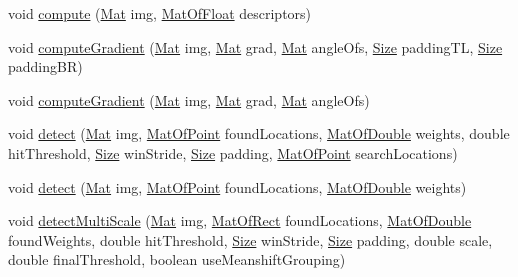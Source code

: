 \begin{DoxyCompactItemize}
\item 
void \mbox{\hyperlink{classorg_1_1opencv_1_1objdetect_1_1_h_o_g_descriptor_ae6d657ee7efb071fa3944b64dfa7db18}{compute}} (\mbox{\hyperlink{classorg_1_1opencv_1_1core_1_1_mat}{Mat}} img, \mbox{\hyperlink{classorg_1_1opencv_1_1core_1_1_mat_of_float}{Mat\+Of\+Float}} descriptors)
\item 
void \mbox{\hyperlink{classorg_1_1opencv_1_1objdetect_1_1_h_o_g_descriptor_aed983cfea26dfd1de8befbf145b4f5b2}{compute\+Gradient}} (\mbox{\hyperlink{classorg_1_1opencv_1_1core_1_1_mat}{Mat}} img, \mbox{\hyperlink{classorg_1_1opencv_1_1core_1_1_mat}{Mat}} grad, \mbox{\hyperlink{classorg_1_1opencv_1_1core_1_1_mat}{Mat}} angle\+Ofs, \mbox{\hyperlink{classorg_1_1opencv_1_1core_1_1_size}{Size}} padding\+TL, \mbox{\hyperlink{classorg_1_1opencv_1_1core_1_1_size}{Size}} padding\+BR)
\item 
void \mbox{\hyperlink{classorg_1_1opencv_1_1objdetect_1_1_h_o_g_descriptor_a3901af3c2c750a427cb8bf250f00871d}{compute\+Gradient}} (\mbox{\hyperlink{classorg_1_1opencv_1_1core_1_1_mat}{Mat}} img, \mbox{\hyperlink{classorg_1_1opencv_1_1core_1_1_mat}{Mat}} grad, \mbox{\hyperlink{classorg_1_1opencv_1_1core_1_1_mat}{Mat}} angle\+Ofs)
\item 
void \mbox{\hyperlink{classorg_1_1opencv_1_1objdetect_1_1_h_o_g_descriptor_a030da8403a85d584e1dc1957838d4336}{detect}} (\mbox{\hyperlink{classorg_1_1opencv_1_1core_1_1_mat}{Mat}} img, \mbox{\hyperlink{classorg_1_1opencv_1_1core_1_1_mat_of_point}{Mat\+Of\+Point}} found\+Locations, \mbox{\hyperlink{classorg_1_1opencv_1_1core_1_1_mat_of_double}{Mat\+Of\+Double}} weights, double hit\+Threshold, \mbox{\hyperlink{classorg_1_1opencv_1_1core_1_1_size}{Size}} win\+Stride, \mbox{\hyperlink{classorg_1_1opencv_1_1core_1_1_size}{Size}} padding, \mbox{\hyperlink{classorg_1_1opencv_1_1core_1_1_mat_of_point}{Mat\+Of\+Point}} search\+Locations)
\item 
void \mbox{\hyperlink{classorg_1_1opencv_1_1objdetect_1_1_h_o_g_descriptor_a48e794dbc6c306f564e56ad8ff4e34a9}{detect}} (\mbox{\hyperlink{classorg_1_1opencv_1_1core_1_1_mat}{Mat}} img, \mbox{\hyperlink{classorg_1_1opencv_1_1core_1_1_mat_of_point}{Mat\+Of\+Point}} found\+Locations, \mbox{\hyperlink{classorg_1_1opencv_1_1core_1_1_mat_of_double}{Mat\+Of\+Double}} weights)
\item 
void \mbox{\hyperlink{classorg_1_1opencv_1_1objdetect_1_1_h_o_g_descriptor_a3f913308de613f4411e1798c18b32be6}{detect\+Multi\+Scale}} (\mbox{\hyperlink{classorg_1_1opencv_1_1core_1_1_mat}{Mat}} img, \mbox{\hyperlink{classorg_1_1opencv_1_1core_1_1_mat_of_rect}{Mat\+Of\+Rect}} found\+Locations, \mbox{\hyperlink{classorg_1_1opencv_1_1core_1_1_mat_of_double}{Mat\+Of\+Double}} found\+Weights, double hit\+Threshold, \mbox{\hyperlink{classorg_1_1opencv_1_1core_1_1_size}{Size}} win\+Stride, \mbox{\hyperlink{classorg_1_1opencv_1_1core_1_1_size}{Size}} padding, double scale, double final\+Threshold, boolean use\+Meanshift\+Grouping)

\end{DoxyCompactItemize}

